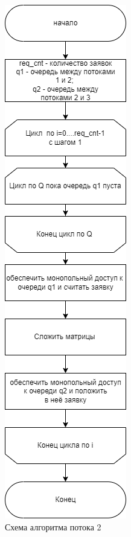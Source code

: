 \begin{figure}[h]
	\centering
	\includegraphics[height=0.8\textheight]{img/sum.png}
	\caption{Схема алгоритма потока 2}
	\label{fig:sum}
\end{figure}

